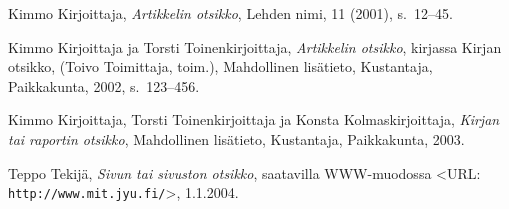 Kimmo Kirjoittaja, \textit{Artikkelin otsikko}, Lehden nimi,
11 (2001), s.~12--45. %

Kimmo Kirjoittaja ja Torsti Toinenkirjoittaja, \textit{Artikkelin otsikko},
kirjassa Kirjan otsikko, (Toivo Toimittaja, toim.), Mahdollinen lisätieto,
Kustantaja, Paikkakunta, 2002, s.~123--456.

Kimmo Kirjoittaja, Torsti Toinenkirjoittaja ja Konsta Kolmaskirjoittaja,
\textit{Kirjan tai raportin otsikko}, Mahdollinen lisätieto,
Kustantaja, Paikkakunta, 2003.

Teppo Tekijä, \textit{Sivun tai sivuston otsikko}, saatavilla WWW-muodossa
<URL: \texttt{http://www.mit.jyu.fi/}>, 1.1.2004. %
